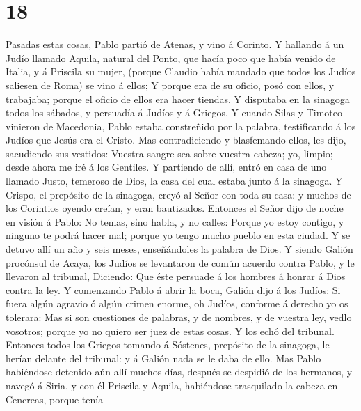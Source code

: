 \hypertarget{section-17}{%
\section{18}\label{section-17}}

 Pasadas estas cosas, Pablo partió de Atenas, y vino á
Corinto.  Y hallando á un Judío llamado Aquila, natural
del Ponto, que hacía poco que había venido de Italia, y á Priscila su
mujer, (porque Claudio había mandado que todos los Judíos saliesen de
Roma) se vino á ellos;  Y porque era de su oficio, posó
con ellos, y trabajaba; porque el oficio de ellos era hacer tiendas.
 Y disputaba en la sinagoga todos los sábados, y persuadía
á Judíos y á Griegos.  Y cuando Silas y Timoteo vinieron
de Macedonia, Pablo estaba constreñido por la palabra, testificando á
los Judíos que Jesús era el Cristo.  Mas contradiciendo y
blasfemando ellos, les dijo, sacudiendo sus vestidos: Vuestra sangre sea
sobre vuestra cabeza; yo, limpio; desde ahora me iré á los Gentiles.
 Y partiendo de allí, entró en casa de uno llamado Justo,
temeroso de Dios, la casa del cual estaba junto á la sinagoga.
 Y Crispo, el prepósito de la sinagoga, creyó al Señor con
toda su casa: y muchos de los Corintios oyendo creían, y eran
bautizados.  Entonces el Señor dijo de noche en visión á
Pablo: No temas, sino habla, y no calles:  Porque yo
estoy contigo, y ninguno te podrá hacer mal; porque yo tengo mucho
pueblo en esta ciudad.  Y se detuvo allí un año y seis
meses, enseñándoles la palabra de Dios.  Y siendo Galión
procónsul de Acaya, los Judíos se levantaron de común acuerdo contra
Pablo, y le llevaron al tribunal,  Diciendo: Que éste
persuade á los hombres á honrar á Dios contra la ley.  Y
comenzando Pablo á abrir la boca, Galión dijo á los Judíos: Si fuera
algún agravio ó algún crimen enorme, oh Judíos, conforme á derecho yo os
tolerara:  Mas si son cuestiones de palabras, y de
nombres, y de vuestra ley, vedlo vosotros; porque yo no quiero ser juez
de estas cosas.  Y los echó del tribunal. 
Entonces todos los Griegos tomando á Sóstenes, prepósito de la sinagoga,
le herían delante del tribunal: y á Galión nada se le daba de ello.
 Mas Pablo habiéndose detenido aún allí muchos días,
después se despidió de los hermanos, y navegó á Siria, y con él Priscila
y Aquila, habiéndose trasquilado la cabeza en Cencreas, porque tenía
